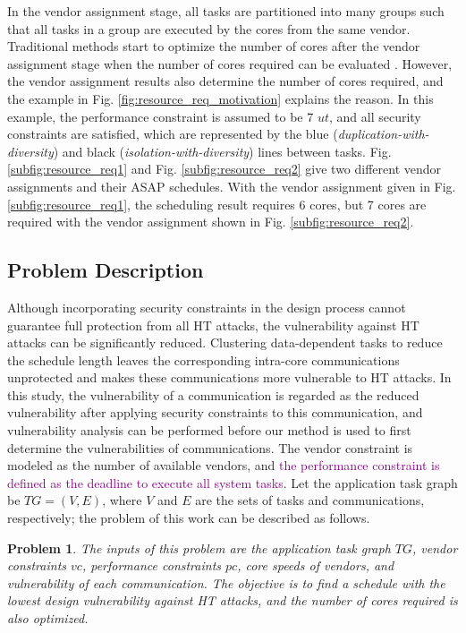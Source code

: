\documentclass[10pt,journal, compsoc]{IEEEtran}
\newtheorem{problem}{\textbf{Problem}}
\begin{document}
In the vendor assignment stage, all tasks are partitioned into many groups such that all tasks in a group are executed by the cores from the same vendor. Traditional methods start to optimize the number of cores after the vendor assignment stage when the number of cores required can be evaluated \cite{article:YS, article:XC, article:CL, article:NW}. However, the vendor assignment results also determine the number of cores required, and the example in Fig. \ref{fig:resource_req_motivation} explains the reason. In this example, the performance constraint is assumed to be 7 $ut$, and all security constraints are satisfied, which are represented by the blue (\textit{duplication-with-diversity}) and black (\textit{isolation-with-diversity}) lines between tasks. Fig. \ref{subfig:resource_req1} and Fig. \ref{subfig:resource_req2} give two different vendor assignments and their ASAP schedules. With the vendor assignment given in Fig. \ref{subfig:resource_req1}, the scheduling result requires 6 cores, but 7 cores are required with the vendor assignment shown in Fig. \ref{subfig:resource_req2}.






\subsection{Problem Description}

Although incorporating security constraints in the design process cannot guarantee full protection from all HT attacks, the vulnerability against HT attacks can be significantly reduced. Clustering data-dependent tasks to reduce the schedule length leaves the corresponding intra-core communications unprotected and makes these communications more vulnerable to HT attacks. In this study, the vulnerability of a communication is regarded as the reduced vulnerability after applying security constraints to this communication, and vulnerability analysis \cite{conference:HS} can be performed before our method is used to first determine the vulnerabilities of communications. The vendor constraint is modeled as the number of available vendors, and \textcolor{purple}{the performance constraint is defined as the deadline to execute all system tasks}. Let the application task graph be $TG=(V,E)$, where $V$ and $E$ are the sets of tasks and communications, respectively; the problem of this work can be described as follows.

\begin{problem}
The inputs of this problem are the application task graph $TG$, vendor constraints $vc$, performance constraints $pc$, core speeds of vendors, and vulnerability of each communication. The objective is to find a schedule with the lowest design vulnerability against HT attacks, and the number of cores required is also optimized.
\end{problem}
\end{document}
